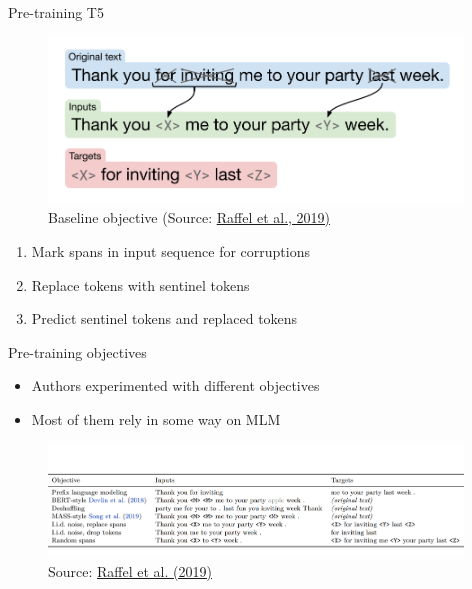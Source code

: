 \begin{frame}{Pre-training T5}

\vfill
	
	\begin{figure}
		\centering
		\includegraphics[width = 11cm]{figure/t5-span-pred.png}\\ 
		\footnotesize{Baseline objective (Source:} \href{https://arxiv.org/pdf/1910.10683.pdf}{\footnotesize Raffel et al., 2019)}
	\end{figure}
	
	\begin{enumerate}
		\item Mark spans in input sequence for corruptions
		\item Replace tokens with sentinel tokens
		\item Predict sentinel tokens and replaced tokens
	\end{enumerate}
	
\vfill

\end{frame}


\begin{frame}{Pre-training objectives}

\vfill

	\begin{itemize}
		\item Authors experimented with different objectives
		\item Most of them rely in some way on MLM
	\end{itemize}
	
	\begin{figure}
		\centering
		\includegraphics[width = 11cm]{figure/t5-objectives1.png}\\ 
		\footnotesize{Source:} \href{https://arxiv.org/pdf/1910.10683.pdf}{\footnotesize Raffel et al. (2019)}
	\end{figure}
	
\vfill

\end{frame}

